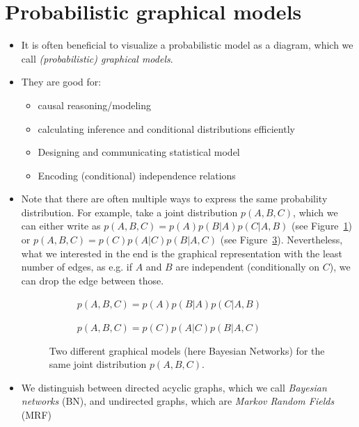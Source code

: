 \section{Probabilistic graphical models}
\begin{itemize}
	\item It is often beneficial to visualize a probabilistic model as a diagram, which we call \textit{(probabilistic) graphical models}. 
	\item They are good for:
	\begin{itemize}
		\item causal reasoning/modeling
		\item calculating inference and conditional distributions efficiently 
		\item Designing and communicating statistical model
		\item Encoding (conditional) independence relations
	\end{itemize} 
	\item Note that there are often multiple ways to express the same probability distribution. For example, take a joint distribution $p(A,B,C)$, which we can either write as $p(A,B,C)=p(A)p(B|A)p(C|A,B)$ (see Figure~\ref{fig:graphical_models_example_1}) or $p(A,B,C)=p(C)p(A|C)p(B|A,C)$ (see Figure~\ref{fig:graphical_models_example_2}). Nevertheless, what we interested in the end is the graphical representation with the least number of edges, as e.g. if $A$ and $B$ are independent (conditionally on $C$), we can drop the edge between those.
	\begin{figure}[ht!]
		\centering
		\begin{subfigure}{0.4\textwidth}
			\centering
			\caption{$p(A,B,C)=p(A)p(B|A)p(C|A,B)$}
			\label{fig:graphical_models_example_1}
		\end{subfigure}
		\hspace{10mm}
		\begin{subfigure}{0.4\textwidth}
			\centering
			\caption{$p(A,B,C)=p(C)p(A|C)p(B|A,C)$}
			\label{fig:graphical_models_example_2}
		\end{subfigure}
		\caption{Two different graphical models (here Bayesian Networks) for the same joint distribution $p(A,B,C)$.}
	\end{figure}
	\item We distinguish between directed acyclic graphs, which we call \textit{Bayesian networks} (BN), and undirected graphs, which are \textit{Markov Random Fields} (MRF)
\end{itemize}

